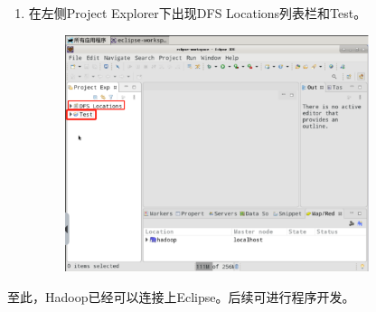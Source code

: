 \documentclass {article}
\begin{document}
\begin{enumerate}
					\item 在左侧Project Explorer下出现DFS Locations列表栏和Test。
					\begin{figure}[H]
						\centering
						\includegraphics[width=3.5in]{figures/fig11.jpg}
					\end{figure}
				\end{enumerate}
				
				至此，Hadoop已经可以连接上Eclipse。后续可进行程序开发。
				
\end{document}
